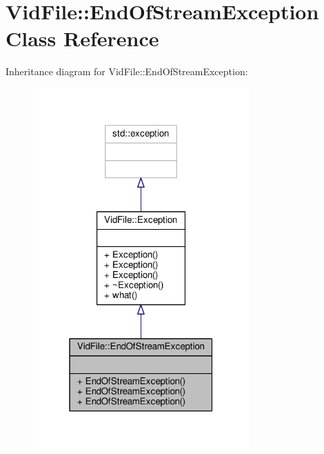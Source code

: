 \hypertarget{classVidFile_1_1EndOfStreamException}{}\section{Vid\+File\+:\+:End\+Of\+Stream\+Exception Class Reference}
\label{classVidFile_1_1EndOfStreamException}


Inheritance diagram for Vid\+File\+:\+:End\+Of\+Stream\+Exception\+:
\nopagebreak
\begin{figure}[H]
\begin{center}
\leavevmode
\includegraphics[width=235pt]{db/dad/classVidFile_1_1EndOfStreamException__inherit__graph}
\end{center}
\end{figure}


